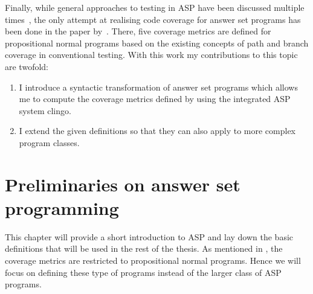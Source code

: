 Finally, while general approaches to testing in ASP have been discussed multiple times~\cite[examples:][]{GOT17, ABR21, Oet22}, the only attempt at realising code coverage for answer set programs has been done in the paper  by~\textcite{Jan+10}. 
There, five coverage metrics are defined for propositional normal programs based on the existing concepts of path and branch coverage in conventional testing. With this work my contributions to this topic are twofold:
\begin{enumerate}
    \item I introduce a syntactic transformation of answer set programs which allows me to compute the coverage metrics defined by \citeauthor{Jan+10} using the integrated ASP system clingo.
    \item I extend the given definitions so that they can also apply to more complex program classes.
\end{enumerate}

\chapter{Preliminaries on answer set programming}
\label{ch:Preliminaries on answer set programming}
This chapter will provide a short introduction to ASP and lay down the basic definitions that will be used in the rest of the thesis. As mentioned in , the coverage metrics are restricted to propositional normal programs. Hence we will focus on defining these type of programs instead of the larger class of ASP programs.
